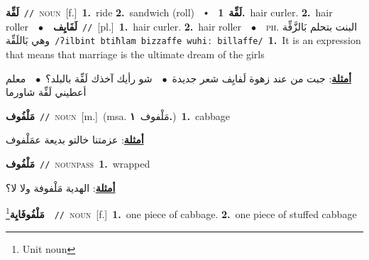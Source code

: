 \documentclass[10pt,a4paper,twoside]{article} %
\begin{document}
\begin{multicols}{2}
{\setlength\topsep{0pt}\textbf{\foreignlanguage{arabic}{لَفِّة}}\ {\color{gray}\texttt{//}\color{black}}\ \textsc{noun}\ [f.]\ \textbf{1.}~ride  \textbf{2.}~sandwich (roll)\ \ $\smblkdiamond$\ \ \setlength\topsep{0pt}\textbf{\foreignlanguage{arabic}{لَفِّة}}\ \textbf{1.}~hair curler.  \textbf{2.}~hair roller\ \ $\bullet$\ \ \setlength\topsep{0pt}\textbf{\foreignlanguage{arabic}{لَفَايِف}}\ {\color{gray}\texttt{//}\color{black}}\ [pl.]\ \textbf{1.}~hair curler.  \textbf{2.}~hair roller\ \ $\bullet$\ \ \textsc{ph.} \color{gray} \foreignlanguage{arabic}{البنت بتحلم بَالزَّفِّة وهي بَاللَفِّة}\color{black}\ {\color{gray}\texttt{/{\sffamily ʔilbint btiħlam bizzaffe wuhiː billaffe}/}\color{black}}\ \textbf{1.}~It is an expression that means that marriage is the ultimate dream of the girls\  \begin{flushright}\color{gray}\foreignlanguage{arabic}{\textbf{\underline{\foreignlanguage{arabic}{أمثلة}}}: جبت من عند زهوة لَفايِف شعر جديدة\ $\bullet$\ \  شو رأيك آخذك لَفِّة بالبلد؟\ $\bullet$\ \  معلم أعطيني لَفِّة شاورما}\end{flushright}\color{black}} \vspace{2mm}

{\setlength\topsep{0pt}\textbf{\foreignlanguage{arabic}{مَلْفُوف}}\ {\color{gray}\texttt{//}\color{black}}\ \textsc{noun}\ [m.]\ \color{gray}(msa. \foreignlanguage{arabic}{مَلْفوف}~\foreignlanguage{arabic}{\textbf{١.}})\color{black}\ \textbf{1.}~cabbage\  \begin{flushright}\color{gray}\foreignlanguage{arabic}{\textbf{\underline{\foreignlanguage{arabic}{أمثلة}}}: عزمتنا خالتو بديعة عمَلْفوف}\end{flushright}\color{black}} \vspace{2mm}

{\setlength\topsep{0pt}\textbf{\foreignlanguage{arabic}{مَلْفُوف}}\ {\color{gray}\texttt{//}\color{black}}\ \textsc{noun\textunderscore pass}\ \textbf{1.}~wrapped\  \begin{flushright}\color{gray}\foreignlanguage{arabic}{\textbf{\underline{\foreignlanguage{arabic}{أمثلة}}}: الهدية مَلْفوفة ولا لا؟}\end{flushright}\color{black}} \vspace{2mm}

{\setlength\topsep{0pt}\textbf{\foreignlanguage{arabic}{مَلْفُوفَايِة}}\footnote{Unit noun}\ \ {\color{gray}\texttt{//}\color{black}}\ \textsc{noun}\ [f.]\ \textbf{1.}~one piece of cabbage.  \textbf{2.}~one piece of stuffed cabbage\ } \vspace{2mm}


\end{multicols}
\end{document}
